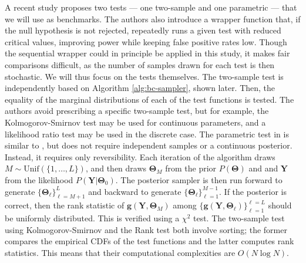 \documentclass[a4paper,11pt]{article}
\begin{document}
A recent study \cite{gandy_unit_2020} proposes two tests --- one two-sample and one parametric --- that we will use as benchmarks. The authors also introduce a wrapper function that, if the null hypothesis is not rejected, repeatedly runs a given test with reduced critical values, improving power while keeping false positive rates low. Though the sequential wrapper could in principle be applied in this study, it makes fair comparisons difficult, as the number of samples drawn for each test is then stochastic. We will thus focus on the tests themselves. The two-sample test is independently based on Algorithm \ref{alg:bc-sampler}, shown later. Then, the equality of the marginal distributions of each of the test functions is tested. The authors avoid prescribing a specific two-sample test, but for example, the Kolmogorov-Smirnov test may be used for continuous parameters, and a likelihood ratio test may be used in the discrete case. The parametric test in \cite{gandy_unit_2020} is similar to \cite{talts_validating_2018}, but does not require independent samples or a continuous posterior. Instead, it requires only reversibility. Each iteration of the algorithm draws $M \sim \mathrm{Unif}(\{1, \ldots, L\})$, and then draws $\mathbf{\Theta}_{M}$ from the prior $P(\mathbf{\Theta})$ and and $\mathbf{Y}$ from the likelihood $P(\mathbf{Y}|\mathbf{\Theta}_{0})$.  The posterior sampler is then run forward to generate $\{\mathbf{\Theta}_{\ell}\}_{\ell=M+1}^{L}$ and backward to generate $\{\mathbf{\Theta}_{\ell}\}_{\ell=1}^{M-1}$. If the posterior is correct, then the rank statistic of $\mathbf{g}(\mathbf{Y},\mathbf{\Theta}_{M})$ among $\{\mathbf{g}(\mathbf{Y},\mathbf{\Theta}_{\ell})\}_{\ell=1}^{\ell=L}$ should be uniformly distributed. This is verified using a $\chi^{2}$ test. The two-sample test using Kolmogorov-Smirnov and the Rank test both involve sorting; the former compares the empirical CDFs of the test functions and the latter computes rank statistics. This means that their computational complexities are $O(N \log N)$.
\end{document}

